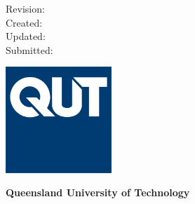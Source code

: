 \makeatletter %
\begin{titlepage}
    \begin{flushright}

        \ifdefined\technotedetails
            \large{\textbf{\technotedetails}}
        \fi
        \vspace*{4cm}

        \huge{\textbf{\@title}}
        \vspace*{2cm} 

        \small{\@author}
        \vspace{2cm} 

        \small{Revision: \revision} \\
        \small{Created: \@date} \\
        \ifdefined\daterevised
            \small{Updated: \daterevised} \\
        \fi
        \ifdefined\datesubmitted
            \small{Submitted: \datesubmitted}
        \fi
        \vfill

        \includegraphics[width=0.3\textwidth]{qut-logo.jpg}

        \vspace*{0.5cm}
        \textbf{Queensland University of Technology} \\
        \small{\department}

    \end{flushright}
\end{titlepage}